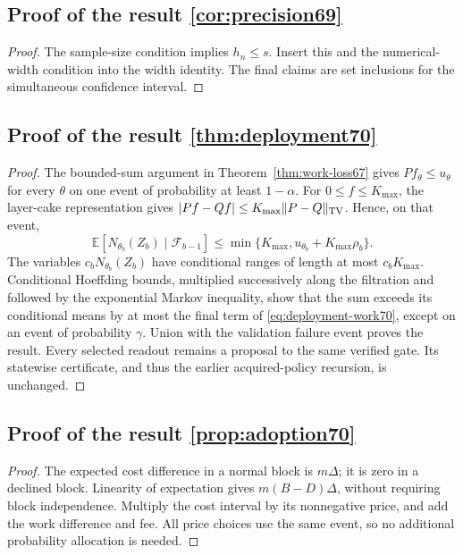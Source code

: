\subsection{Proof of the result \ref{cor:precision69}}\label{supp:proof70-centered69-2}
\begin{proof}
The sample-size condition implies $h_n\le s$. Insert this and the numerical-width condition into the width identity. The final claims are set inclusions for the simultaneous confidence interval.
\end{proof}

\subsection{Proof of the result \ref{thm:deployment70}}\label{supp:proof70-deployment70-1}
\begin{proof}
The bounded-sum argument in Theorem~\ref{thm:work-loss67} gives $P f_\theta\le u_\theta$ for every $\theta$ on one event of probability at least $1-\alpha$. For $0\le f\le K_{\max}$, the layer-cake representation gives $|Pf-Qf|\le K_{\max}\|P-Q\|_{\rm TV}$. Hence, on that event,
\[
 \mathbb E[N_{\theta_b}(Z_b)\mid\mathcal F_{b-1}]
 \le\min\{K_{\max},u_{\theta_b}+K_{\max}\rho_b\}.
\]
The variables $c_bN_{\theta_b}(Z_b)$ have conditional ranges of length at most $c_bK_{\max}$. Conditional Hoeffding bounds, multiplied successively along the filtration and followed by the exponential Markov inequality, show that the sum exceeds its conditional means by at most the final term of \eqref{eq:deployment-work70}, except on an event of probability $\gamma$. Union with the validation failure event proves the result. Every selected readout remains a proposal to the same verified gate. Its statewise certificate, and thus the earlier acquired-policy recursion, is unchanged.
\end{proof}

\subsection{Proof of the result \ref{prop:adoption70}}\label{supp:proof70-deployment70-2}
\begin{proof}
The expected cost difference in a normal block is $m\Delta$; it is zero in a declined block. Linearity of expectation gives $m(B-D)\Delta$, without requiring block independence. Multiply the cost interval by its nonnegative price, and add the work difference and fee. All price choices use the same event, so no additional probability allocation is needed.
\end{proof}


